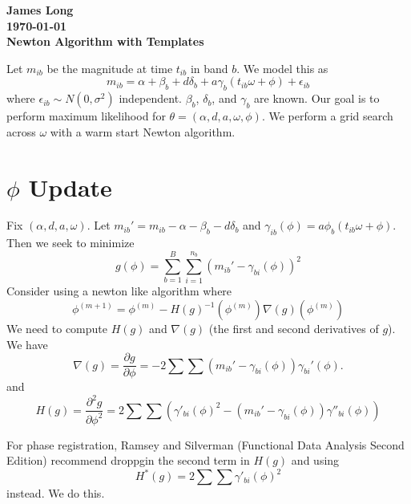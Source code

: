 \documentclass[12pt]{article}
\title{}
\date{}
\author{}
\begin{document}
\noindent
\textbf{James Long}\\
\textbf{\today}\\
\textbf{Newton Algorithm with Templates}

Let $m_{ib}$ be the magnitude at time $t_{ib}$ in band $b$. We model this as
\begin{equation*}
m_{ib} = \alpha + \beta_b + d\delta_b + a\gamma_b(t_{ib}\omega + \phi) + \epsilon_{ib}
\end{equation*}
where $\epsilon_{ib} \sim N(0,\sigma^2)$ independent. $\beta_b$, $\delta_b$, and $\gamma_b$ are known. Our goal is to perform maximum likelihood for $\theta = (\alpha,d,a,\omega,\phi)$. We perform a grid search across $\omega$ with a warm start Newton algorithm.

\section{$\phi$ Update}

Fix $(\alpha,d,a,\omega)$. Let $m_{ib}' = m_{ib} - \alpha - \beta_b - d\delta_b$ and $\gamma_{ib}(\phi) = a\phi_b(t_{ib}\omega + \phi)$. Then we seek to minimize
\begin{equation*}
g(\phi) = \sum_{b=1}^B\sum_{i=1}^{n_b} (m_{ib}' - \gamma_{bi}(\phi))^2
\end{equation*}
Consider using a newton like algorithm where
\begin{equation*}
\phi^{(m+1)} = \phi^{(m)} - H(g)^{-1}(\phi^{(m)})\nabla(g)(\phi^{(m)})
\end{equation*}
We need to compute $H(g)$ and $\nabla(g)$ (the first and second derivatives of $g$). We have
\begin{equation*}
\nabla(g) = \frac{\partial g}{\partial \phi} = - 2\sum \sum (m_{ib}' - \gamma_{bi}(\phi))\gamma_{bi}'(\phi).
\end{equation*}
and
\begin{equation*}
H(g) = \frac{\partial^2 g}{\partial \phi^2} = 2 \sum \sum \left(\gamma'_{bi}(\phi)^2 - (m_{ib}' - \gamma_{bi}(\phi))\gamma''_{bi}(\phi)\right)
\end{equation*}

For phase registration, Ramsey and Silverman (Functional Data Analysis Second Edition) recommend droppgin the second term in $H(g)$ and using
\begin{equation*}
H^*(g) = 2 \sum \sum \gamma'_{bi}(\phi)^2 
\end{equation*}
instead. We do this.

%
%
\end{document}
